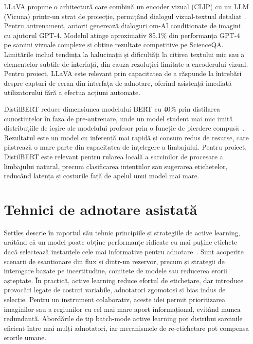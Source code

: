 LLaVA propune o arhitectură care combină un encoder vizual (CLIP) cu un LLM (Vicuna) printr-un strat de proiecție, permițând dialogul vizual-textual detaliat~\cite{liu2023visualinstructiontuning}. Pentru antrenament, autorii generează dialoguri om-AI condiționate de imagini cu ajutorul GPT-4. Modelul atinge aproximativ 85.1\% din performanța GPT-4 pe sarcini vizuale complexe și obține rezultate competitive pe ScienceQA. Limitările includ tendința la halucinații și dificultăți la citirea textului mic sau a elementelor subtile de interfață, din cauza rezoluției limitate a encoderului vizual. Pentru proiect, LLaVA este relevant prin capacitatea de a răspunde la întrebări despre capturi de ecran din interfața de adnotare, oferind asistență imediată utilizatorului fără a efectua acțiuni automate.

DistilBERT reduce dimensiunea modelului BERT cu 40\% prin distilarea cunoștințelor în faza de pre-antrenare, unde un model student mai mic imită distribuțiile de ieșire ale modelului profesor prin o funcție de pierdere compusă~\cite{sanh2020distilbertdistilledversionbert}. Rezultatul este un model cu inferență mai rapidă și consum redus de resurse, care păstrează o mare parte din capacitatea de înțelegere a limbajului. Pentru proiect, DistilBERT este relevant pentru rularea locală a sarcinilor de procesare a limbajului natural, precum clasificarea intențiilor sau sugerarea etichetelor, reducând latența și costurile față de apelul unui model mai mare.

\section{Tehnici de adnotare asistată}

Settles descrie în raportul său tehnic principiile și strategiile de active learning, arătând că un model poate obține performanțe ridicate cu mai puține etichete dacă selectează instanțele cele mai informative pentru adnotare~\cite{settles.tr09}. Sunt acoperite scenarii de eșantionare din flux și dintr-un rezervor, precum și strategii de interogare bazate pe incertitudine, comitete de modele sau reducerea erorii așteptate. În practică, active learning reduce efortul de etichetare, dar introduce provocări legate de costuri variabile, adnotatori zgomotoși și bias indus de selecție. Pentru un instrument colaborativ, aceste idei permit prioritizarea imaginilor sau a regiunilor cu cel mai mare aport informațional, evitând munca redundantă. Abordările de tip batch-mode active learning pot distribui sarcinile eficient între mai mulți adnotatori, iar mecanismele de re-etichetare pot compensa erorile umane.

